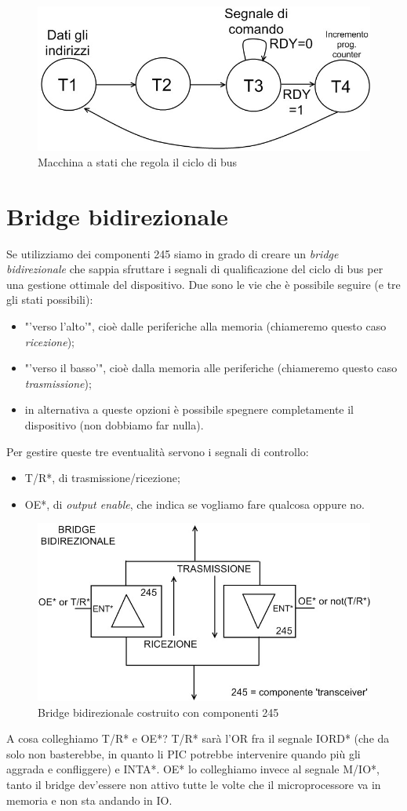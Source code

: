 \begin{figure}[!h]
\centering
\includegraphics[width=0.65\columnwidth]{img/macchinaStatiCicloBus}
\caption{Macchina a stati che regola il ciclo di bus}
\label{fig:macchinaStatiCicloBus}
\end{figure}

\section{Bridge bidirezionale}
\label{sec:bridgeBidi}

Se utilizziamo dei componenti 245 siamo in grado di creare un \textit{bridge bidirezionale} che sappia sfruttare i segnali di qualificazione del ciclo di bus per una gestione ottimale del dispositivo. Due sono le vie che è possibile seguire (e tre gli stati possibili):
\begin{itemize}
\item "'verso l'alto'", cioè dalle periferiche alla memoria (chiameremo questo caso \textit{ricezione});
\item "'verso il basso'", cioè dalla memoria alle periferiche (chiameremo questo caso \textit{trasmissione});
\item in alternativa a queste opzioni è possibile spegnere completamente il dispositivo (non dobbiamo far nulla).
\end{itemize}
Per gestire queste tre eventualità servono i segnali di controllo:
\begin{itemize}
\item T/R*, di trasmissione/ricezione;
\item OE*, di \textit{output enable}, che indica se vogliamo fare qualcosa oppure no.
\end{itemize}

\begin{figure}[!h]
\centering
\includegraphics[width=0.55\columnwidth]{img/bridgeBidirezionale}
\caption{Bridge bidirezionale costruito con componenti 245}
\label{fig:bridgeBidirezionale}
\end{figure}

A cosa colleghiamo T/R* e OE*?
T/R* sarà l'OR fra il segnale IORD* (che da solo non basterebbe, in quanto li PIC potrebbe intervenire quando più gli aggrada e confliggere) e INTA*. OE* lo colleghiamo invece al segnale M/IO*, tanto il bridge dev'essere non attivo tutte le volte che il microprocessore va in memoria e non sta andando in IO.
